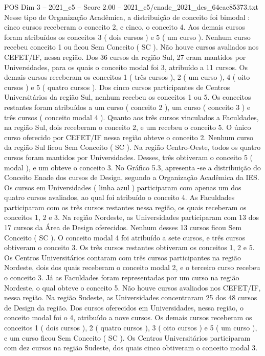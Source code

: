 \begin{textsample}{POS Dim 3 – 2021\_c5 – Score 2.00 – 2021\_c5/enade\_2021\_des\_64eae85373.txt}
Nesse tipo de Organização Acadêmica, a distribuição de conceito foi bimodal : cinco cursos receberam o conceito 2, e cinco, o conceito 4.
Aos demais cursos foram atribuídos os conceitos 3 ( dois cursos ) e 5 ( um curso ).
Nenhum curso recebeu conceito 1 ou ficou Sem Conceito ( SC ).
Não houve cursos avaliados nos CEFET/IF, nessa região.
Dos 36 cursos da região Sul, 27 eram mantidos por Universidades, para os quais o conceito modal foi 3, atribuído a 11 cursos.
Os demais cursos receberam os conceitos 1 ( três cursos ), 2 ( um curso ), 4 ( oito cursos ) e 5 ( quatro cursos ).
Dos cinco cursos participantes de Centros Universitários da região Sul, nenhum recebeu os conceitos 1 ou 5.
Os conceitos restantes foram atribuídos a um curso ( conceito 2 ), um curso ( conceito 3 ) e três cursos ( conceito modal 4 ).
Quanto aos três cursos vinculados a Faculdades, na região Sul, dois receberam o conceito 2, e um recebeu o conceito 5.
O único curso oferecido por CEFET/IF nessa região obteve o conceito 2.
Nenhum curso da região Sul ficou Sem Conceito ( SC ).
Na região Centro-Oeste, todos os quatro cursos foram mantidos por Universidades.
Desses, três obtiveram o conceito 5 ( modal ), e um obteve o conceito 3.
No Gráfico 5.3, apresenta -se a distribuição do Conceito Enade dos cursos de Design, segundo a Organização Acadêmica da IES.
Os cursos em Universidades ( linha azul ) participaram com apenas um dos quatro cursos avaliados, ao qual foi atribuído o conceito 4.
As Faculdades participaram com os três cursos restantes nessa região, os quais receberam os conceitos 1, 2 e 3.
Na região Nordeste, as Universidades participaram com 13 dos 17 cursos da Área de Design oferecidos.
Nenhum desses 13 cursos ficou Sem Conceito ( SC ).
O conceito modal 4 foi atribuído a sete cursos, e três cursos obtiveram o conceito 3.
Os três cursos restantes obtiveram os conceitos 1, 2 e 5.
Os Centros Universitários contaram com três cursos participantes na região Nordeste, dois dos quais receberam o conceito modal 2, e o terceiro curso recebeu o conceito 3.
Já as Faculdades foram representadas por um curso na região Nordeste, o qual obteve o conceito 5.
Não houve cursos avaliados nos CEFET/IF, nessa região.
Na região Sudeste, as Universidades concentraram 25 dos 48 cursos de Design da região.
Dos cursos oferecidos em Universidades, nessa região, o conceito modal foi o 4, atribuído a nove cursos.
Os demais cursos receberam os conceitos 1 ( dois cursos ), 2 ( quatro cursos ), 3 ( oito cursos ) e 5 ( um curso ), e um curso ficou Sem Conceito ( SC ).
Os Centros Universitários participaram com dez cursos na região Sudeste, dos quais cinco obtiveram o conceito modal 3.

\end{textsample}
